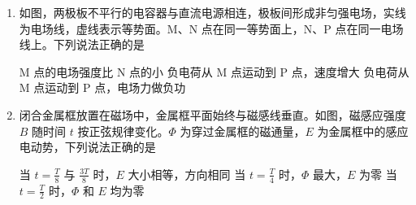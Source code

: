 \documentclass[\gkver]{gaokaozhenti}
\begin{document}
\begin{enumerate}
{联立解得 $v_{1} = v$，$v_{2} = 0$

小球 A 在竖直方向上做匀加速直线运动，则有 $h = \frac{1}{2}gt^{2}$

解得 $t = 2 \Us$

可知，碰撞后，小球 A 运动 $t' = 1 \Us$ 落地，则水平方向上有 $x = vt'$

解得 $v = 3.0 \Ums$

故选 B。
}

\item
如图，两极板不平行的电容器与直流电源相连，极板间形成非匀强电场，实线为电场线，虚线表示等势面。M、N 点在同一等势面上，N、P 点在同一电场线上。下列说法正确的是


{M 点的电场强度比 N 点的小}
{负电荷从 M 点运动到 P 点，速度增大}
{负电荷从 M 点运动到 P 点，电场力做负功}


\item
闭合金属框放置在磁场中，金属框平面始终与磁感线垂直。如图，磁感应强度 $B$ 随时间 $t$ 按正弦规律变化。$\Phi$ 为穿过金属框的磁通量，$E$ 为金属框中的感应电动势，下列说法正确的是

\onepicture[w=5.20cm]{}

{当 $t = \frac{T}{8}$ 与 $\frac{3T}{8}$ 时，$E$ 大小相等，方向相同}
{当 $t = \frac{T}{4}$ 时，$\Phi$ 最大，$E$ 为零}
{当 $t = \frac{T}{2}$ 时，$\Phi$ 和 $E$ 均为零}

\end{enumerate}
\end{document}
